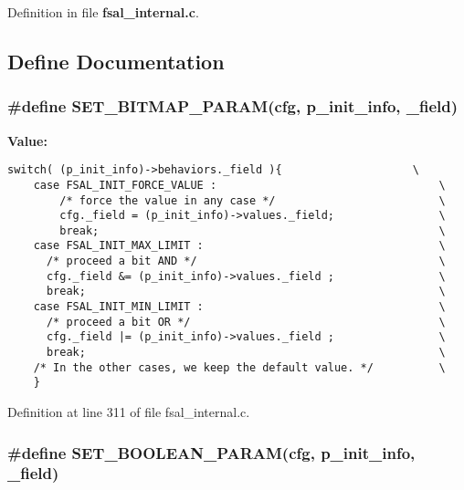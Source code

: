 Definition in file {\bf fsal\_\-internal.c}.

\subsection{Define Documentation}
\subsubsection[{SET\_\-BITMAP\_\-PARAM}]{\setlength{\rightskip}{0pt plus 5cm}\#define SET\_\-BITMAP\_\-PARAM(cfg, \/  p\_\-init\_\-info, \/  \_\-field)}\label{fsal__internal_8c_ba08a3bf394576d1a142b9f4b81867bf}


\textbf{Value:}

\begin{Code}\begin{verbatim}switch( (p_init_info)->behaviors._field ){                    \
    case FSAL_INIT_FORCE_VALUE :                                  \
        /* force the value in any case */                         \
        cfg._field = (p_init_info)->values._field;                \
        break;                                                    \
    case FSAL_INIT_MAX_LIMIT :                                    \
      /* proceed a bit AND */                                     \
      cfg._field &= (p_init_info)->values._field ;                \
      break;                                                      \
    case FSAL_INIT_MIN_LIMIT :                                    \
      /* proceed a bit OR */                                      \
      cfg._field |= (p_init_info)->values._field ;                \
      break;                                                      \
    /* In the other cases, we keep the default value. */          \
    }
\end{verbatim}
\end{Code}


Definition at line 311 of file fsal\_\-internal.c.
\subsubsection[{SET\_\-BOOLEAN\_\-PARAM}]{\setlength{\rightskip}{0pt plus 5cm}\#define SET\_\-BOOLEAN\_\-PARAM(cfg, \/  p\_\-init\_\-info, \/  \_\-field)}\label{fsal__internal_8c_2d4e102fe0da3b9340d2448907db42c6}


